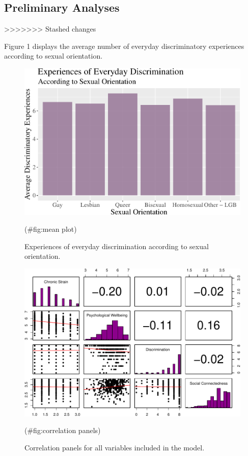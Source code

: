 \documentclass[
  english,
  man,floatsintext]{apa6}
\begin{document}
\hypertarget{preliminary-analyses}{%
\subsection{Preliminary Analyses}\label{preliminary-analyses}}
>>>>>>> Stashed changes

Figure 1 displays the average number of everyday discriminatory experiences according to sexual orientation.

\begin{figure}

{\centering \includegraphics{prep_script_files/figure-latex/mean plot-1} 

}

\caption{Experiences of everyday discrimination according to sexual orientation.}(\#fig:mean plot)
\end{figure}

\begin{figure}

{\centering \includegraphics{prep_script_files/figure-latex/correlation panels-1} 

}

\caption{Correlation panels for all variables included in the model.}(\#fig:correlation panels)
\end{figure}
\end{document}
